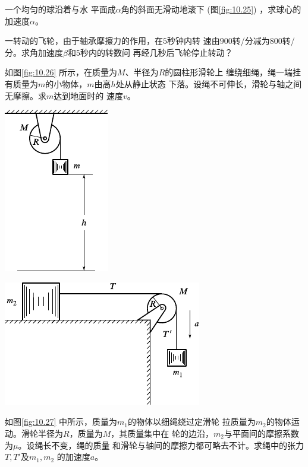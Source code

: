 \begin{exercises}
\exercise 一个均匀的球沿着与水
平面成$ \alpha $角的斜面无滑动地滚下
(图\ref{fig:10.25})  ，求球心的加速度$ \alpha $。

\exercise 一转动的飞轮，由于轴承摩擦力的作用，在$ 5 $秒钟内转
速由$ 900 $转/分减为$ 800 $转/分。求角加速度$ \beta $和$ 5 $秒内的转数问
再经几秒后飞轮停止转动？

\exercise 如图\ref{fig:10.26} 所示，在质量为$ M $、半径为$ R $的圆柱形滑轮上
缠绕细绳，绳一端挂有质量为$ m $的小物体，$ m $由高$ h $处从静止状态
下落。设绳不可伸长，滑轮与轴之间无摩擦。求$ m $达到地面时的
速度$ v $。
\begin{figurex}
    \begin{minipage}[b]{0.4\linewidth}
        \centering
        \includegraphics{figure/fig10.26}
        \caption{}
        \label{fig:10.26}
    \end{minipage}
    \begin{minipage}[b]{0.4\linewidth}
        \centering
        \includegraphics{figure/fig10.27}
        \caption{}
        \label{fig:10.27}
    \end{minipage}
\end{figurex}

\exercise 如图\ref{fig:10.27} 中所示，质量为$  m _ { 1 }   $的物体以细绳绕过定滑轮
拉质量为$  m _ { 2 }   $的物体运动。滑轮半径为$ R $，质量为$ M $，其质量集中在
轮的边沿，$ m_2 $与平面间的摩擦系数为$ \mu $。设绳长不变，绳的质量
和滑轮与轴间的摩擦力都可略去不计。求绳中的张力$ T, T' $及$ m_1, m_2 $
的加速度$ a $。


\end{exercises}
